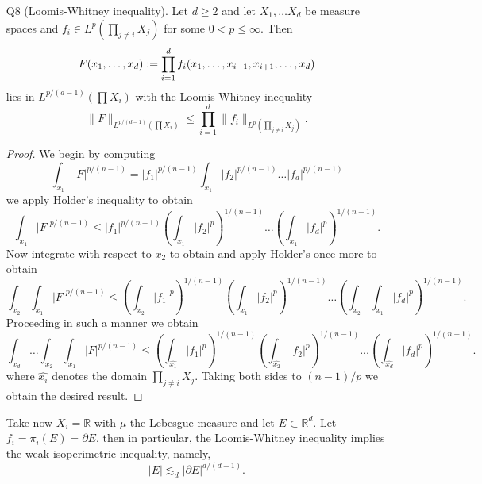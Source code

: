 \documentclass[11pt]{article}
\theoremstyle{remark}
\newcommand{\1}{\textbf{1}}
\newcommand{\lle}{\lesssim}
\def\norm#1{\| #1  \|}
\newcommand{\bbR}{\mathbb{R}}
\begin{document}
\begin{enumerate}
\begin{proof}
\[\]
hence it suffices to consider the case where each $f_i \geq 1/2N$. Now by Remark 6.8, we note that for $f$ with $A \leq |f(x)| \leq AN$,
\[
\norm{f}_{p, q_1} \sim_{p,q} \log N \norm{f}_{p,q_2}.
\]
To see this, note that by Theorem 6.6, (iii) we can write $m$ as a sum of at most $\log(N)$ terms hence by Holder's inequality, we have for $q_1 > q_2$
\[
\norm{2^m \mu(E_m)^{1/p} }_{\ell^{q_1}} \leq \log N \norm{2^m \mu(E_m)^{1/p} }_{\ell^{q_2}}
\]
In particular, $\norm{f}_{1} = \norm{f}_{1,1} \leq \log N \norm{f}_{1,\infty}$, thus
\[
\norm{f_1}_{L^1} + \ldots + \norm{f_N }_{L^{1}} \leq \log N ( \norm{f_1 }_{L^{1,\infty}} + \ldots + \norm{f_N }_{L^{1,\infty}}),
\]
and by Chebyshev, 
\[
\norm{f_1 + \ldots + f_N }_{L^{1, \infty}} \leq  \norm{f_1 + \ldots + f_N }_{L^{1,1}} 
\]
which yields the result.
\end{proof}
\item[Q8] (Loomis-Whitney inequality). Let $d \geq 2$ and let $X_1, \ldots X_d$ be measure spaces and $f_i \in L^p( \prod_{j \neq i} X_j)$ for some $0 < p \leq \infty$. Then
\[
F(x_1, \mathellipsis, x_d) : =\prod_{i=1}^d f_i(x_1,\ldots,x_{i-1}, x_{i+1}, \ldots, x_d)
\]
lies in $L^{p/(d-1)} ( \prod X_i)$ with the Loomis-Whitney inequality
\[
\norm{F}_{L^{p/(d-1)}(\prod X_i)} \leq \prod_{i=1}^d \norm{f_i}_{L^p (\prod_{j \neq i} X_j)}.
\]
\begin{proof}
We begin by computing
\[
\int_{x_1} |F|^{p/(n-1)} = |f_1|^{p/(n-1)} \int_{x_1} |f_2|^{p/(n-1)} \ldots |f_d|^{p/(n-1)}
\]
we apply Holder's inequality to obtain
\[
\int_{x_1} |F|^{p/(n-1)} \leq |f_1|^{p/(n-1)} \left( \int_{x_1} |f_2|^{p} \right)^{1/(n-1)} \ldots \left(\int_{x_1} |f_d|^{p} \right)^{1/(n-1)}.
\]
Now integrate with respect to $x_2$ to obtain and apply Holder's once more to obtain
\[
\int_{x_2} \int_{x_1} |F|^{p/(n-1)} \leq \left(\int_{x_2} |f_1|^{p} \right)^{1/(n-1)} \left( \int_{x_1} |f_2|^{p} \right)^{1/(n-1)} \ldots \left(\int_{x_2} \int_{x_1} |f_d|^{p} \right)^{1/(n-1)}.
\]
Proceeding in such a manner we obtain
\[
\int_{x_d} \ldots \int_{x_2} \int_{x_1} |F|^{p/(n-1)} \leq \left(\int_{\widehat{x_1}} |f_1|^{p} \right)^{1/(n-1)} \left( \int_{\widehat{x_2}} |f_2|^{p} \right)^{1/(n-1)} \ldots \left( \int_{\widehat{x_d}}|f_d|^{p} \right)^{1/(n-1)}.
\]
where $\widehat{x_i}$ denotes the domain $\prod_{j \neq i} X_j$. Taking both sides to $(n-1)/p$ we obtain the desired result.
\end{proof}
Take now $X_i = \bbR$ with $\mu$ the Lebesgue measure and let $E \subset \bbR^d$. Let $f_i = \pi_i(E) = \partial E$, then in particular, the Loomis-Whitney inequality implies the weak isoperimetric inequality, namely,
\[
|E| \lle_d |\partial E|^{d/(d-1)}.
\]
\end{enumerate}
\end{document}
